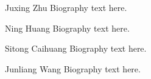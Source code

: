 \documentclass[journal]{IEEEtran}
\begin{document}
    \begin{IEEEbiography}{Juxing Zhu}
        Biography text here.
    \end{IEEEbiography}

    \begin{IEEEbiography}{Ning Huang}
        Biography text here.
    \end{IEEEbiography}

    \begin{IEEEbiography}{Sitong Caihuang}
        Biography text here.
    \end{IEEEbiography}

    \begin{IEEEbiography}{Junliang Wang}
        Biography text here.
    \end{IEEEbiography}

%





\end{document}
